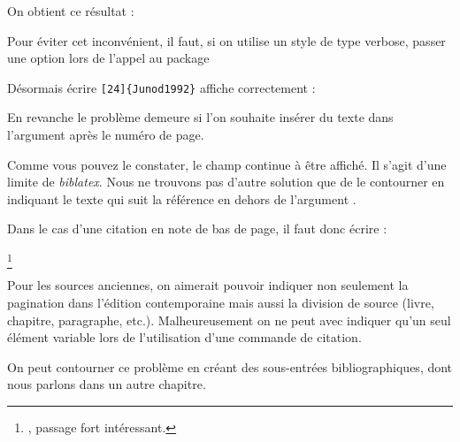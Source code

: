 On obtient ce résultat :

\begin{quotation}
\end{quotation}



Pour éviter cet inconvénient, il faut, si on utilise un style de type verbose, passer une option lors de l'appel au package 

\begin{latexcode}
\usepackage[citestyle=verbose,citepages=omit]{biblatex}
\end{latexcode}

Désormais écrire \verb|[24]{Junod1992}|
affiche correctement :

\begin{quotation}
\cite[24]{Junod1992}
\end{quotation}

En revanche le problème demeure si l'on souhaite insérer du texte dans l'argument  après le numéro de page.

\begin{latexcode}
\cite[\pno~24, passage fort intéressant.]{Junod1992}
\end{latexcode}

\begin{quotation}
\cite[\pno~24, passage fort intéressant.]{Junod1992}
\end{quotation}

Comme vous pouvez le constater, le champ  continue à être affiché. Il s'agit d'une limite de \emph{biblatex}. Nous ne trouvons pas d'autre solution que de le contourner en indiquant le texte qui suit la référence en dehors de l'argument . 

Dans le cas d'une citation en note de bas de page, il faut donc écrire :

\begin{latexcode}
\footnote{\cite[24]{Junod1992}, passage fort intéressant.}
\end{latexcode}

\begin{attention}
Pour les sources anciennes, on aimerait pouvoir indiquer non seulement la pagination dans l'édition contemporaine mais aussi la division de source (livre, chapitre, paragraphe, etc.). Malheureusement on ne peut avec  indiquer qu'un seul élément variable lors de l'utilisation d'une commande de citation.

On peut contourner ce problème en créant des sous-entrées bibliogra\-phiques, dont nous parlons dans un autre chapitre. 
\end{attention}


